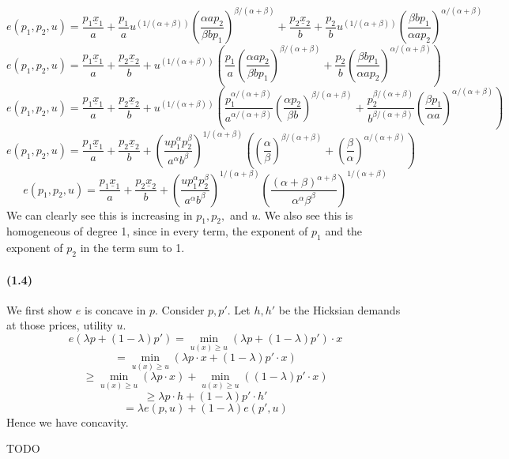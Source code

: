 \documentclass[10pt,letter]{article}
\begin{document}
\[ e(p_1, p_2, u) = \frac{p_1\underline{x}_1}{a} + \frac{p_1}{a}u^{(1/(\alpha+\beta))} \left(\frac{\alpha a p_2}{\beta b p_1}\right)^{\beta/(\alpha+\beta)} + \frac{p_2 \underline{x}_2}{b} + \frac{p_2}{b} u^{(1/(\alpha+\beta))}\left(\frac{\beta b p_1}{\alpha a p_2}\right)^{\alpha/(\alpha + \beta)} \]
\[ e(p_1, p_2, u) = \frac{p_1\underline{x}_1}{a}+ \frac{p_2 \underline{x}_2}{b} + u^{(1/(\alpha+\beta))} \left( \frac{p_1}{a} \left(\frac{\alpha a p_2}{\beta b p_1}\right)^{\beta/(\alpha+\beta)}  + \frac{p_2}{b}\left(\frac{\beta b p_1}{\alpha a p_2}\right)^{\alpha/(\alpha + \beta)} \right) \]
\[ e(p_1, p_2, u) = \frac{p_1\underline{x}_1}{a}+ \frac{p_2 \underline{x}_2}{b} + u^{(1/(\alpha+\beta))} \left( \frac{p_1^{\alpha/(\alpha+\beta)}}{a^{\alpha/(\alpha+\beta)}} \left(\frac{\alpha  p_2}{\beta b }\right)^{\beta/(\alpha+\beta)}  + \frac{p_2^{\beta/(\alpha+\beta)}}{b^{\beta/(\alpha+\beta)}}\left(\frac{\beta  p_1}{\alpha a}\right)^{\alpha/(\alpha + \beta)} \right) \]
\[ e(p_1, p_2, u) = \frac{p_1\underline{x}_1}{a}+ \frac{p_2 \underline{x}_2}{b} + \left( \frac{u p_1^{\alpha}p_2^{\beta}}{a^{\alpha}b^{\beta}} \right)^{1/(\alpha + \beta)} \left(  \left(\frac{\alpha }{\beta }\right)^{\beta/(\alpha+\beta)}  + \left(\frac{\beta }{\alpha}\right)^{\alpha/(\alpha + \beta)} \right) \]
\[ e(p_1, p_2, u) = \frac{p_1\underline{x}_1}{a}+ \frac{p_2 \underline{x}_2}{b} + \left( \frac{u p_1^{\alpha}p_2^{\beta}}{a^{\alpha}b^{\beta}} \right)^{1/(\alpha + \beta)} \left(  \frac{(\alpha + \beta)^{\alpha+\beta}}{\alpha^{\alpha}\beta^{\beta}} \right)^{1/(\alpha + \beta)} \]
We can clearly see this is increasing in $p_1, p_2,$ and $u$. We also see this is homogeneous of degree 1, since in every term, the exponent of $p_1$ and the exponent of $p_2$ in the term sum to 1.
\paragraph{(1.4)}
We first show $e$ is concave in $p$. Consider $p, p'$. Let $h, h'$ be the Hicksian demands at those prices, utility $u$.
\[ e(\lambda p + (1-\lambda) p') = \min_{u(x) \ge u} (\lambda p + (1-\lambda)p')\cdot x \]
\[ = \min_{u(x) \ge u} (\lambda p\cdot x + (1-\lambda)p'\cdot x) \]
\[ \ge \min_{u(x) \ge u} (\lambda p\cdot x) + \min_{u(x) \ge u}((1-\lambda)p'\cdot x) \]
\[ \ge \lambda p\cdot h + (1-\lambda)p'\cdot h' \]
\[ = \lambda e(p, u) + (1-\lambda)e(p', u) \]
Hence we have concavity.




TODO
\end{document}
